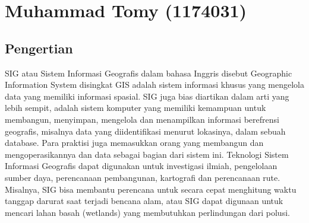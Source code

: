 \section{Muhammad Tomy (1174031)}
\subsection{Pengertian}
SIG atau Sistem Informasi Geografis dalam bahasa Inggris disebut Geographic Information System disingkat GIS adalah sistem informasi khusus yang mengelola data yang memiliki informasi spasial. SIG juga bias diartikan  dalam arti yang lebih sempit, adalah sistem komputer yang memiliki kemampuan untuk membangun, menyimpan, mengelola dan menampilkan informasi berefrensi geografis, misalnya data yang diidentifikasi menurut lokasinya, dalam sebuah database. Para praktisi juga memasukkan orang yang membangun dan mengoperasikannya dan data sebagai bagian dari sistem ini. Teknologi Sistem Informasi Geografis dapat digunakan untuk investigasi ilmiah, pengelolaan sumber daya, perencanaan pembangunan, kartografi dan perencanaan rute. Misalnya, SIG bisa membantu perencana untuk secara cepat menghitung waktu tanggap darurat saat terjadi bencana alam, atau SIG dapat digunaan untuk mencari lahan basah (wetlands) yang membutuhkan perlindungan dari polusi.


